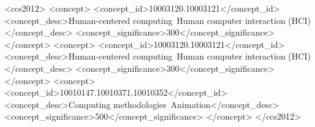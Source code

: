 

\begin{CCSXML}
<ccs2012>
   <concept>
      <concept_id>10003120.10003121</concept_id>
      <concept_desc>Human-centered computing~Human computer interaction (HCI)</concept_desc>
      <concept_significance>300</concept_significance>
   </concept>
   <concept>
      <concept_id>10003120.10003121</concept_id>
      <concept_desc>Human-centered computing~Human computer interaction (HCI)</concept_desc>
      <concept_significance>300</concept_significance>
   </concept>
   <concept>
      <concept_id>10010147.10010371.10010352</concept_id>
      <concept_desc>Computing methodologies~Animation</concept_desc>
      <concept_significance>500</concept_significance>
   </concept>
</ccs2012>
\end{CCSXML}
   



